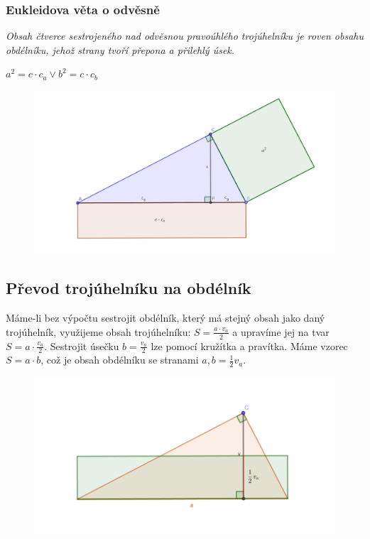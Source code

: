 \documentclass[12pt, a4paper]{article}
\begin{document}
\subsubsection*{Eukleidova věta o odvěsně}
\textit{Obsah čtverce sestrojeného nad odvěsnou pravoúhlého trojúhelníku je roven obsahu obdélníku, jehož strany tvoří přepona a přilehlý úsek.}\\
\begin{center}
$a^2 = c \cdot c_a \lor b^2 = c \cdot c_b$
\end{center}
\begin{figure}[H]
\centering
\includegraphics[scale=0.3]{evo}
\end{figure}

\subsection*{Převod trojúhelníku na obdélník}
Máme-li bez výpočtu sestrojit obdélník, který má stejný obsah jako daný trojúhelník, využijeme obsah trojúhelníku: $S = \frac{a\cdot v_a}{2}$ a upravíme jej na tvar 
$S = a \cdot \frac{v_a}{2}$. Sestrojit úsečku $b = \frac{v_a}{2}$ lze pomocí kružítka a pravítka. Máme vzorec $S = a \cdot b$, což je obsah obdélníku se stranami $a,b=\frac{1}{2}v_a$.\\
\begin{figure}[H]
\centering
\includegraphics[scale=0.6]{prevodtnaob}
\end{figure}
\end{document}
